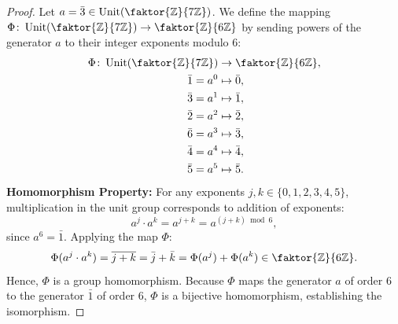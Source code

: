 \begin{content}

\begin{proof}
Let $a = \bar{3} \in \operatorname{Unit}(\faktor{\mathbb{Z}}{7\mathbb{Z}})$. We define the mapping $\Phi \colon \operatorname{Unit}(\faktor{\mathbb{Z}}{7\mathbb{Z}}) \to \faktor{\mathbb{Z}}{6\mathbb{Z}}$ by sending powers of the generator $a$ to their integer exponents modulo $6$:
\begin{align*}
    \Phi \colon \operatorname{Unit}(\faktor{\mathbb{Z}}{7\mathbb{Z}}) &\to \faktor{\mathbb{Z}}{6\mathbb{Z}}, \\
    \bar{1} = a^0 &\mapsto \bar{0}, \\
    \bar{3} = a^1 &\mapsto \bar{1}, \\
    \bar{2} = a^2 &\mapsto \bar{2}, \\
    \bar{6} = a^3 &\mapsto \bar{3}, \\
    \bar{4} = a^4 &\mapsto \bar{4}, \\
    \bar{5} = a^5 &\mapsto \bar{5}.
\end{align*}
\textbf{Homomorphism Property:} For any exponents $j, k \in \{0, 1, 2, 3, 4, 5\}$, multiplication in the unit group corresponds to addition of exponents:
\[
a^j \cdot a^k = a^{j+k} = a^{(j+k) \bmod 6},
\]
since $a^6 = \bar{1}$. Applying the map $\Phi$:
\[
\Phi(a^j \cdot a^k) = \overline{j + k} = \bar{j} + \bar{k} = \Phi(a^j) + \Phi(a^k) \in \faktor{\mathbb{Z}}{6\mathbb{Z}}.
\]
Hence, $\Phi$ is a group homomorphism. Because $\Phi$ maps the generator $a$ of order $6$ to the generator $\bar{1}$ of order $6$, $\Phi$ is a bijective homomorphism, establishing the isomorphism.
\end{proof}


\end{content}
